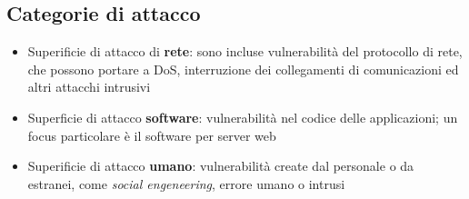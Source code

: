 \subsection{Categorie di attacco}
\begin{itemize}
    \item Superificie di attacco di \textbf{rete}: sono incluse vulnerabilità del protocollo
    di rete, che possono portare a DoS, interruzione dei collegamenti di comunicazioni ed altri 
    attacchi intrusivi
    \item Superficie di attacco \textbf{software}: vulnerabilità nel codice delle applicazioni; un focus 
    particolare è il software per server web 
    \item Superificie di attacco \textbf{umano}: vulnerabilità create dal personale o da estranei, come 
    \textit{social engeneering}, errore umano o intrusi
\end{itemize}



























